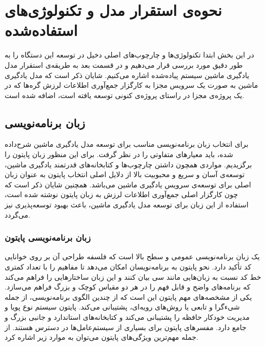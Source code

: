 \chapter{نحوه‌ی استقرار مدل و تکنولوژی‌های استفاده‌شده}

در این بخش ابتدا تکنولوژی‌ها و چارچوب‌های اصلی دخیل در توسعه این دستگاه را به طور دقیق مورد بررسی قرار می‌دهیم و در قسمت بعد به طریقه‌ی استقرار مدل یادگیری ماشین سیستم پیاده‌شده اشاره می‌کنیم. شایان ذکر است که مدل یادگیری ماشین به صورت یک سرویس مجزا به کارگزار 
جمع‌آوری اطلاعات لرزش گره‌ها که در یک پروژه‌ی مجزا در راستای پروژه‌ی کنونی توسعه یافته است، اضافه شده است.

\section{‌‌زبان برنامه‌نویسی}
برای انتخاب زبان برنامه‌نویسی مناسب برای توسعه مدل یادگیری ماشین شرح‌داده شده، باید معیارهای متفاوتی را در نظر گرفت. برای این منظور زبان پایتون را برگزیدیم. مواردی همچون داشتن چارچوب‌ها و کتابخانه‌های قدرتمند یادگیری ماشین، توسعه‌ی آسان و سریع و محبوبیت بالا از دلایل اصلی انتخاب پایتون به عنوان زبان اصلی برای توسعه‌ی سرویس یادگیری ماشین می‌باشد. همچنین شایان ذکر است که چون کارگزار اصلی جمع‌آوری اطلاعات لرزش به زبان پایتون نوشته شده است، استفاده از این زبان برای توسعه مدل یادگیری ماشین، باعث بهبود توسعه‌پذیری نیز می‌گردد. 

\subsection{زبان برنامه‌نویسی پایتون}
یک زبان برنامه‌نویسی عمومی و سطح بالا است که فلسفه طراحی آن بر روی خوانایی کد تأکید دارد. نحو پایتون به برنامه‌نویسان امکان می‌دهد تا مفاهیم را با تعداد کمتری خط کد نسبت به زبان‌هایی مانند سی بیان کنند و این زبان ساختارهایی را فراهم می‌کند که برنامه‌های واضح و قابل فهم را در هر دو مقیاس کوچک و بزرگ فراهم می‌سازد\cite{van2007python}. یکی از مشخصه‌های مهم پایتون این است که از چندین الگوی برنامه‌نویسی، از جمله شیءگرا و تابعی یا روش‌های رویه‌ای، پشتیبانی می‌کند. پایتون سیستم نوع پویا و مدیریت خودکار حافظه را پشتیبانی می‌کند و کتابخانه‌های استاندارد و جانبی بزرگ و جامع دارد. مفسرهای پایتون برای بسیاری از سیستم‌عامل‌ها در دسترس هستند\cite{srinath2017python}. از جمله مهم‌ترین ویژگی‌های پایتون می‌توان به موارد زیر اشاره کرد.

